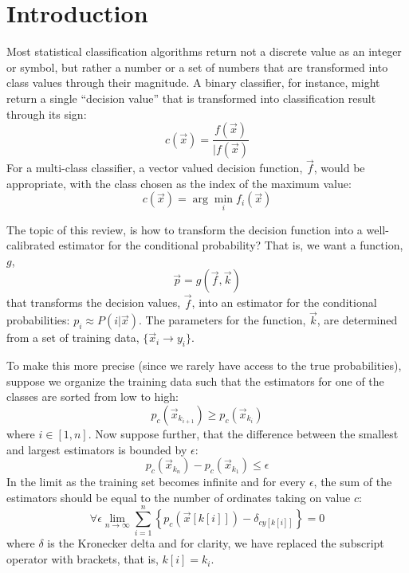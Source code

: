 \documentclass{article}
\newcommand{\classvalue}{c}
\newcommand{\binarydecision}{f}
\newcommand{\multidecision}{f}
\newcommand{\testpoint}{\vec x}
\newcommand{\transform}{g}
\newcommand{\param}{k}
\newcommand{\estimator}{{p}}
\newcommand{\condprob}{P}
\newcommand{\coord}{x}
\newcommand{\ord}{y}
\newcommand{\bound}{\epsilon}
\begin{document}
\section{Introduction}

Most statistical classification algorithms return not a discrete value as an 
integer or symbol, but rather a
number or a set of numbers that are transformed into class values through
their magnitude.
A binary classifier, for instance, might return a single ``decision value'' that
is transformed into classification result through its sign:
\begin{equation}
	\classvalue(\testpoint) = \frac{\binarydecision(\testpoint)}{|\binarydecision(\testpoint)}
\end{equation}
For a multi-class classifier, a vector valued decision function, 
$\vec \multidecision$, would be appropriate, with the class chosen as the
index of the maximum value:
\begin{equation}
	\classvalue(\testpoint) = \arg \min_i \multidecision_i (\vec x)
\end{equation}

The topic of this review, is how to transform the decision function into a
well-calibrated estimator for the conditional probability?
That is, we want a function, $\transform$,
\begin{equation}
  \vec \estimator = \transform(\vec \multidecision, \vec \param)
\end{equation}
that transforms the decision
values, $\vec \multidecision$, into an estimator for the conditional
probabilities: $\estimator_i \approx \condprob(i|\testpoint)$.
The parameters for the function, $\vec \param$, are determined from a set of 
training data, $\lbrace \vec \coord_i \rightarrow \ord_i \rbrace$.

To make this more precise (since we rarely have access to the true
probabilities), suppose we organize the training data such that
the estimators for one of the classes are sorted from low to high:
\begin{equation}
	\estimator_c (\vec \coord_{k_{i+1}}) \ge \estimator_c (\vec \coord_{k_i})
\end{equation}
where $i\in[1, n]$.
Now suppose further, that the difference between the smallest and largest
estimators is bounded by $\bound$:
\begin{equation}
	\estimator_c (\vec \coord_{k_n}) - \estimator_c (\vec \coord_{k_1}) \le \bound
\end{equation}
In the limit as the training set becomes infinite and for every $\bound$,
the sum of the estimators should be equal to the number of ordinates taking
on value $c$:
\begin{equation}
	\forall \bound \lim_{n \rightarrow \infty} \sum_{i=1}^n \left \lbrace \estimator_c\left (\vec \coord[k[i]]\right ) - \delta_{c\ord[k[i]]} \right \rbrace = 0
	\label{calibrated_definition}
\end{equation}
where $\delta$ is the Kronecker delta and for clarity, we have replaced the
subscript operator with brackets, that is, $k[i]=k_i$.
\end{document}
